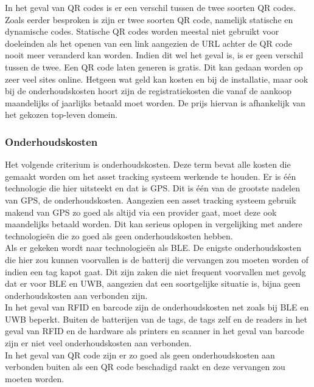 In het geval van QR codes is er een verschil tussen de twee soorten QR codes. Zoals eerder besproken is zijn er twee soorten QR code, namelijk statische en dynamische codes. Statische QR codes worden meestal niet gebruikt voor doeleinden als het openen van een link aangezien de URL achter de QR code nooit meer veranderd kan worden. Indien dit wel het geval is, is er geen verschil tussen de twee. Een QR code laten generen is gratis. Dit kan gedaan worden op zeer veel sites online. Hetgeen wat geld kan kosten en bij de installatie, maar ook bij de onderhoudskosten hoort zijn de registratiekosten die vanaf de aankoop maandelijks of jaarlijks betaald moet worden. De prijs hiervan is afhankelijk van het gekozen top-leven domein. \\

\subsubsection{Onderhoudskosten}
Het volgende criterium is onderhoudskosten. Deze term bevat alle kosten die gemaakt worden om het asset tracking systeem werkende te houden. Er is één technologie die hier uitsteekt en dat is GPS. Dit is één van de grootste nadelen van GPS, de onderhoudskosten. Aangezien een asset tracking systeem gebruik makend van GPS zo goed als altijd via een provider gaat, moet deze ook maandelijks betaald worden. Dit kan serieus oplopen in vergelijking met andere technologieën die zo goed als geen onderhoudskosten hebben. \\

Als er gekeken wordt naar technologieën als BLE. De enigste onderhoudskosten die hier zou kunnen voorvallen is de batterij die vervangen zou moeten worden of indien een tag kapot gaat. Dit zijn zaken die niet frequent voorvallen met gevolg dat er voor BLE en UWB, aangezien dat een soortgelijke situatie is, bijna geen onderhoudskosten aan verbonden zijn.\\

In het geval van RFID en barcode zijn de onderhoudskosten net zoals bij BLE en UWB beperkt. Buiten de batterijen van de tags, de tags zelf en de readers in het geval van RFID en de hardware als printers en scanner in het geval van barcode zijn er niet veel onderhoudskosten aan verbonden.\\

In het geval van QR code zijn er zo goed als geen onderhoudskosten aan verbonden buiten als een QR code beschadigd raakt en deze vervangen zou moeten worden.

